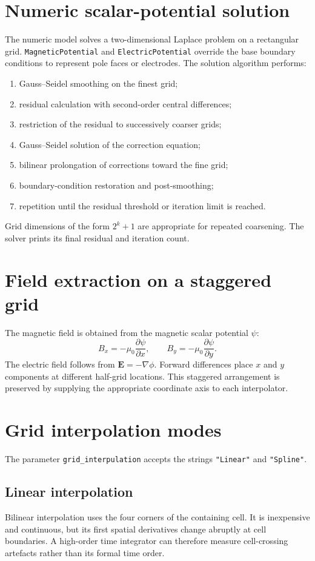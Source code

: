 \documentclass[11pt,a4paper]{report}
\newcommand{\code}[1]{\texttt{#1}}
\newcommand{\vect}[1]{\bm{#1}}
\begin{document}
\section{Numeric scalar-potential solution}
The numeric model solves a two-dimensional Laplace problem on a rectangular
grid.  \code{MagneticPotential} and \code{ElectricPotential} override the
base boundary conditions to represent pole faces or electrodes.  The solution
algorithm performs:
\begin{enumerate}[noitemsep]
  \item Gauss--Seidel smoothing on the finest grid;
  \item residual calculation with second-order central differences;
  \item restriction of the residual to successively coarser grids;
  \item Gauss--Seidel solution of the correction equation;
  \item bilinear prolongation of corrections toward the fine grid;
  \item boundary-condition restoration and post-smoothing;
  \item repetition until the residual threshold or iteration limit is reached.
\end{enumerate}
Grid dimensions of the form $2^k+1$ are appropriate for repeated coarsening.
The solver prints its final residual and iteration count.

\section{Field extraction on a staggered grid}
The magnetic field is obtained from the magnetic scalar potential $\psi$:
\begin{equation}
  B_x=-\mu_0\frac{\partial\psi}{\partial x},\qquad
  B_y=-\mu_0\frac{\partial\psi}{\partial y}.
\end{equation}
The electric field follows from $\vect{E}=-\nabla\phi$.  Forward differences
place $x$ and $y$ components at different half-grid locations.  This staggered
arrangement is preserved by supplying the appropriate coordinate axis to each
interpolator.

\section{Grid interpolation modes}
The parameter \code{grid\_interpulation} accepts the strings
\code{"Linear"} and \code{"Spline"}.

\subsection{Linear interpolation}
Bilinear interpolation uses the four corners of the containing cell.  It is
inexpensive and continuous, but its first spatial derivatives change abruptly
at cell boundaries.  A high-order time integrator can therefore measure
cell-crossing artefacts rather than its formal time order.
\end{document}
